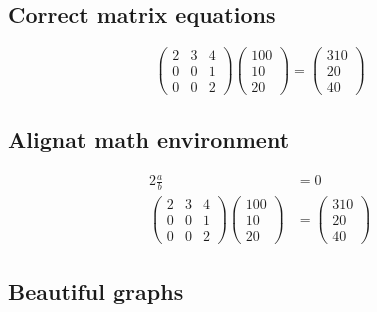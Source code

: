 \documentclass{article}%
\begin{document}
\subsection{Correct matrix equations}%
\label{subsec:Correctmatrixequations}%
\[%
\begin{pmatrix}%
2&3&4\\%
0&0&1\\%
0&0&2%
\end{pmatrix} \begin{pmatrix}%
100\\%
10\\%
20%
\end{pmatrix} = \begin{pmatrix}%
310\\%
20\\%
40%
\end{pmatrix}%
\]

%
\subsection{Alignat math environment}%
\label{subsec:Alignatmathenvironment}%
\begin{alignat*}{2}%
\frac{a}{b} &= 0 \\%
\begin{pmatrix}%
2&3&4\\%
0&0&1\\%
0&0&2%
\end{pmatrix}%
\begin{pmatrix}%
100\\%
10\\%
20%
\end{pmatrix}%
&=%
\begin{pmatrix}%
310\\%
20\\%
40%
\end{pmatrix}%
\end{alignat*}

%
\subsection{Beautiful graphs}%
\label{subsec:Beautifulgraphs}%

%
\end{document}
